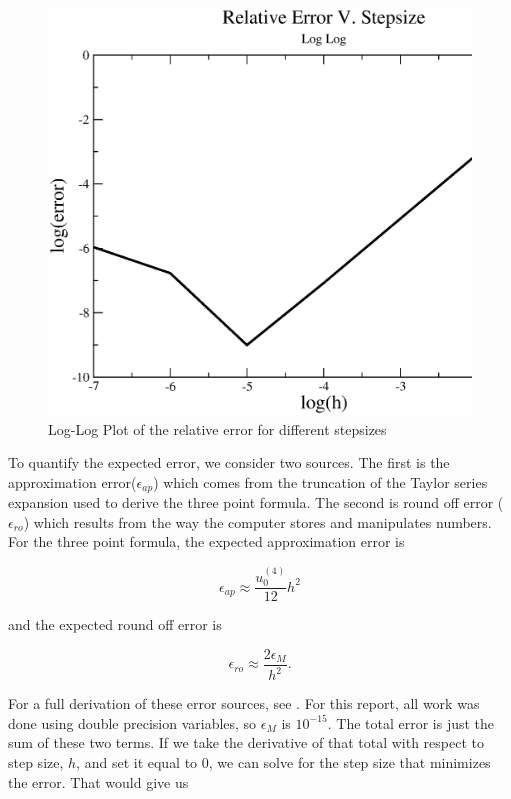 \documentclass[%
oneside,                 %
final,                   %
10pt]{article}
\begin{document}
\begin{figure}[H]
\label{fig:error}
  \centering
    \includegraphics[width=1.2\textwidth]{RelativeError.eps}
    \caption{Log-Log Plot of the relative error for different stepsizes}
\end{figure}

To quantify the expected error, we consider two sources.  The first is the approximation error($\epsilon_{ap}$) which comes from the truncation of the Taylor series expansion used to derive the three point formula.  The second is round off error ($\epsilon_{ro}$) which results from the way the computer stores and manipulates numbers.  For the three point formula, the expected approximation error is 

\begin{equation*}
\epsilon_{ap}\approx \frac{u_0^{(4)}}{12}h^2
\end{equation*}

and the expected round off error is

\begin{equation*}
\epsilon_{ro}\approx \frac{2 \epsilon_M}{h^2}.
\end{equation*}

For a full derivation of these error sources, see \cite{ClassNotes}.  For this report, all work was done using double precision variables, so $\epsilon_M$ is $10^{-15}$.  The total error is just the sum of these two terms.  If we take the derivative of that total with respect to step size, $h$, and set it equal to 0, we can solve for the step size that minimizes the error.  That would give us 
\end{document}
